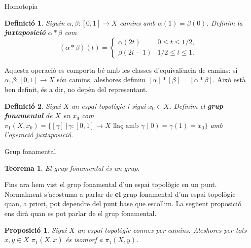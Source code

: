 \documentclass{beamer}
\newtheorem{teorema}{Teorema}
\newtheorem{definicio}{Definici\'{o}}
\newtheorem{proposicio}{Proposici\'{o}}
\theoremstyle{definition}
\begin{document}
\begin{frame}{Homotopia}
\begin{definicio}
Siguin $\alpha,\beta:[0,1]\rightarrow X$ camins amb $\alpha(1)=\beta(0)$. Definim la \textbf{juxtaposici\'{o}} $\alpha*\beta$ com
\[(\alpha*\beta)(t)=\left\{\begin{array}{ll}\alpha(2t)&0\leq t\leq1/2,\\\beta(2t-1)&1/2\leq t\leq1.\end{array}\right.\]
\end{definicio}
\pause

Aquesta operaci\'{o} es comporta b\'{e} amb les classes d'equival\`{e}ncia de camins: si $\alpha,\beta:[0,1]\rightarrow X$ s\'{o}n camins, aleshores definim $[\alpha]*[\beta]=[\alpha*\beta]$. Aix\`{o} est\`{a} ben definit, \'{e}s a dir, no dep\`{e}n del representant.
\pause

\begin{definicio}
Sigui $X$ un espai topol\`{o}gic i sigui $x_0\in X$. Definim el \textbf{grup fonamental} de $X$ en $x_0$ com $\pi_1(X,x_0)=\{[\gamma]\,|\,\gamma:[0,1]\rightarrow X\text{ lla\c{c} amb }\gamma(0)=\gamma(1)=x_0\}$ amb l'operaci\'{o} juxtaposici\'{o}.
\end{definicio}

\end{frame}

\begin{frame}{Grup fonamental}
\begin{teorema}
El grup fonamental \'{e}s un grup.
\end{teorema}
\pause

Fins ara hem vist el grup fonamental d'un espai topol\`{o}gic en un punt. Normalment s'acostuma a parlar de \textbf{el} grup fonamental d'un espai topol\`{o}gic quan, a priori, pot dependre del punt base que escollim. La seg\"{u}ent proposici\'{o} ens dir\`{a} quan es pot parlar de el grup fonamental.
\pause

\begin{proposicio}
Sigui $X$ un espai topol\`{o}gic connex per camins. Aleshores per tots $x,y\in X$ $\pi_1(X,x)$ \'{e}s isomorf a $\pi_1(X,y)$.
\end{proposicio}
\end{frame}
\end{document}
